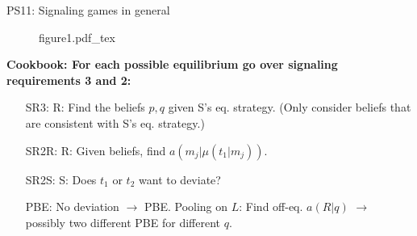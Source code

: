 \begin{frame}{PS11: Signaling games in general}
\begin{multicols}{2}
\begin{itemize}
      \end{itemize}
      \vfill\null\columnbreak
      \begin{figure}[!h]
        \center
        \def\svgwidth{\columnwidth}
        {figure1.pdf_tex}
      \end{figure} \vspace{-6pt}
      \textbf{Cookbook: For each possible equilibrium go over signaling requirements 3 and 2:}\vspace{-6pt}
      \begin{itemize}
        \item[SR3:] R: Find the beliefs $p,q$ given S's eq. strategy. (Only consider beliefs that are consistent with S's eq. strategy.)
        \item[SR2R:] \vspace{-2pt} R: Given beliefs, find $a(m_j|\mu(t_1|m_j))$.
        \item[SR2S:] \vspace{-2pt} S: Does $t_1$ or $t_2$ want to deviate?
        \item[PBE:]  \vspace{-2pt} No deviation $\rightarrow$ PBE. Pooling on $L$: Find off-eq. $a(R|q)$ $\rightarrow$ possibly two different PBE for different $q$.
      \end{itemize}
      \vfill\null
    \end{multicols}
\end{frame}
